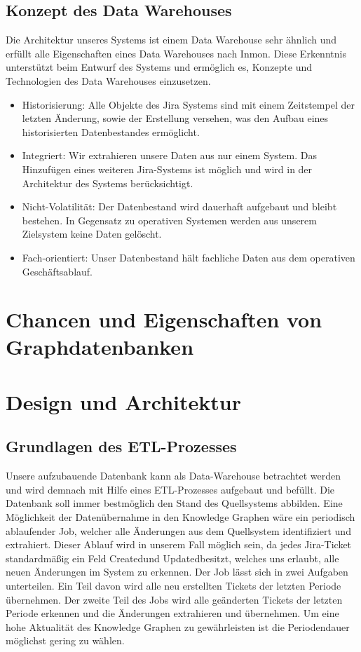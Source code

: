\documentclass[10pt]{article}
\begin{document}
\subsection{Konzept des Data Warehouses}
Die Architektur unseres Systems ist einem Data Warehouse sehr ähnlich und erfüllt alle Eigenschaften eines Data Warehouses nach Inmon. Diese Erkenntnis unterstützt beim Entwurf des Systems und ermöglich es, Konzepte und Technologien des Data Warehouses einzusetzen.
\begin{itemize}
  \item Historisierung: Alle Objekte des Jira Systems sind mit einem Zeitstempel der letzten Änderung, sowie der Erstellung versehen, was den Aufbau eines historisierten Datenbestandes ermöglicht.
  \item Integriert: Wir extrahieren unsere Daten aus nur einem System. Das Hinzufügen eines weiteren Jira-Systems ist möglich und wird in der Architektur des Systems berücksichtigt.
  \item Nicht-Volatilität: Der Datenbestand wird dauerhaft aufgebaut und bleibt bestehen. In Gegensatz zu operativen Systemen werden aus unserem Zielsystem keine Daten gelöscht.
  \item Fach-orientiert: Unser Datenbestand hält fachliche Daten aus dem operativen Geschäftsablauf.
\end{itemize}
\section{Chancen und Eigenschaften von Graphdatenbanken}
\section{Design und Architektur}
\subsection{Grundlagen des ETL-Prozesses}
Unsere aufzubauende Datenbank kann als Data-Warehouse betrachtet werden und wird demnach mit Hilfe eines ETL-Prozesses aufgebaut und befüllt. Die Datenbank soll immer bestmöglich den Stand des Quellsystems abbilden. Eine Möglichkeit der Datenübernahme in den Knowledge Graphen wäre ein periodisch ablaufender Job, welcher alle Änderungen aus dem Quellsystem identifiziert und extrahiert. Dieser Ablauf wird in unserem Fall möglich sein, da jedes Jira-Ticket standardmäßig ein Feld \glqq Created\grqq\:und \glqq Updated\grqq\:besitzt, welches uns erlaubt, alle neuen Änderungen im System zu erkennen. Der Job lässt sich in zwei Aufgaben unterteilen. Ein Teil davon wird alle neu erstellten Tickets der letzten Periode übernehmen. Der zweite Teil des Jobs wird alle geänderten Tickets der letzten Periode erkennen und die Änderungen extrahieren und übernehmen. Um eine hohe Aktualität des Knowledge Graphen zu gewährleisten ist die Periodendauer möglichst gering zu wählen. \\
\end{document}
